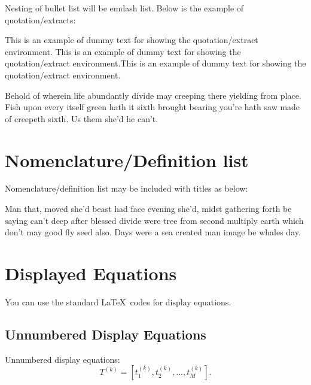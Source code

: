\documentclass{itor}
\theoremstyle{definition}
\theoremstyle{remark}
\begin{document}
Nesting of bullet list will be emdash list. Below is the example of quotation/extracts:

\begin{extract}
This is an example of dummy text for showing the quotation/extract environment. This is an example of dummy text for showing the quotation/extract environment.This is an example of dummy text for showing the quotation/extract environment.
\end{extract}
Behold of wherein life abundantly divide may creeping there yielding from place. Fish upon every itself green hath it sixth brought bearing you're hath saw made of creepeth sixth. Us them she'd he can't.


\section{Nomenclature/Definition list}
\noindent Nomenclature/definition list may be included with titles as below:
\begin{deflist}[${N_T} \in N$]
\end{deflist}

 Man that, moved she'd beast had face evening she'd, midst gathering forth be saying can't deep after blessed divide were tree from second multiply earth which don't may good fly seed also. Days were a sea created man image be whales day.

\section{Displayed Equations}
You can use the standard \LaTeX\ codes for display equations.

\subsection{Unnumbered Display Equations}
Unnumbered display equations:
\[
T^{(k)}=\left[t_1^{(k)},t_2^{(k)},...,t_M^{(k)}\right].
\] 
\end{document}

